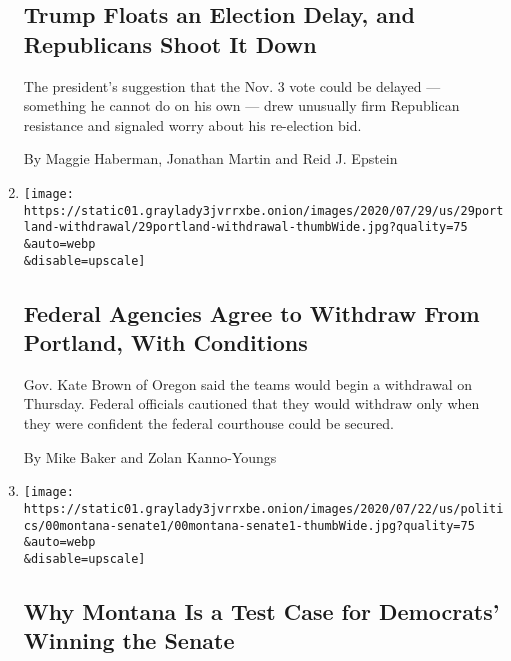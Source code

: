 \begin{enumerate}
  \hypertarget{trump-floats-an-election-delay-and-republicans-shoot-it-down}{%
  \subsection{Trump Floats an Election Delay, and Republicans Shoot It
  Down}\label{trump-floats-an-election-delay-and-republicans-shoot-it-down}}

  The president's suggestion that the Nov. 3 vote could be delayed ---
  something he cannot do on his own --- drew unusually firm Republican
  resistance and signaled worry about his re-election bid.

  By Maggie Haberman, Jonathan Martin and Reid J. Epstein
\item
  \href{/2020/07/29/us/protests-portland-federal-withdrawal.html}{}

  \texttt{[image: https://static01.graylady3jvrrxbe.onion/images/2020/07/29/us/29portland-withdrawal/29portland-withdrawal-thumbWide.jpg?quality=75\\\&auto=webp\\\&disable=upscale]}

  \hypertarget{federal-agencies-agree-to-withdraw-from-portland-with-conditions}{%
  \subsection{Federal Agencies Agree to Withdraw From Portland, With
  Conditions}\label{federal-agencies-agree-to-withdraw-from-portland-with-conditions}}

  Gov. Kate Brown of Oregon said the teams would begin a withdrawal on
  Thursday. Federal officials cautioned that they would withdraw only
  when they were confident the federal courthouse could be secured.

  By Mike Baker and Zolan Kanno-Youngs
\item
  \href{/2020/07/27/us/politics/montana-senate-bullock-daines.html}{}

  \texttt{[image: https://static01.graylady3jvrrxbe.onion/images/2020/07/22/us/politics/00montana-senate1/00montana-senate1-thumbWide.jpg?quality=75\\\&auto=webp\\\&disable=upscale]}

  \hypertarget{why-montana-is-a-test-case-for-democrats-winning-the-senate}{%
  \subsection{Why Montana Is a Test Case for Democrats' Winning the
  Senate}\label{why-montana-is-a-test-case-for-democrats-winning-the-senate}}


\end{enumerate}
